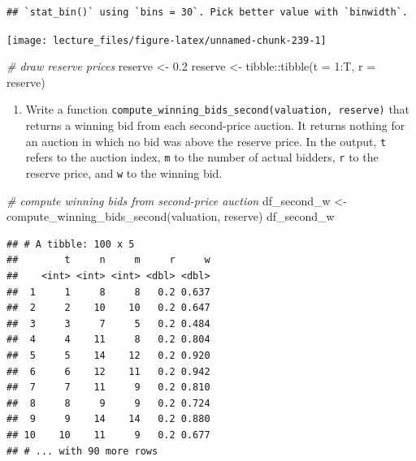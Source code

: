 \documentclass[
]{book}
\newenvironment{Shaded}{\begin{snugshade}}{\end{snugshade}}
\newcommand{\AttributeTok}[1]{\textcolor[rgb]{0.77,0.63,0.00}{#1}}
\newcommand{\CommentTok}[1]{\textcolor[rgb]{0.56,0.35,0.01}{\textit{#1}}}
\newcommand{\DecValTok}[1]{\textcolor[rgb]{0.00,0.00,0.81}{#1}}
\newcommand{\FloatTok}[1]{\textcolor[rgb]{0.00,0.00,0.81}{#1}}
\newcommand{\FunctionTok}[1]{\textcolor[rgb]{0.00,0.00,0.00}{#1}}
\newcommand{\NormalTok}[1]{#1}
\newcommand{\OtherTok}[1]{\textcolor[rgb]{0.56,0.35,0.01}{#1}}
\newcommand{\SpecialCharTok}[1]{\textcolor[rgb]{0.00,0.00,0.00}{#1}}
\providecommand{\tightlist}{%
  \setlength{\itemsep}{0pt}\setlength{\parskip}{0pt}}
\begin{document}
\begin{verbatim}
## `stat_bin()` using `bins = 30`. Pick better value with `binwidth`.
\end{verbatim}

\begin{center}\texttt{[image: lecture\_files/figure-latex/unnamed-chunk-239-1]} \end{center}

\begin{Shaded}
\begin{Highlighting}[]
\CommentTok{\# draw reserve prices}
\NormalTok{reserve }\OtherTok{\textless{}{-}} \FloatTok{0.2}
\NormalTok{reserve }\OtherTok{\textless{}{-}}\NormalTok{ tibble}\SpecialCharTok{::}\FunctionTok{tibble}\NormalTok{(}\AttributeTok{t =} \DecValTok{1}\SpecialCharTok{:}\NormalTok{T, }\AttributeTok{r =}\NormalTok{ reserve)}
\end{Highlighting}
\end{Shaded}

\begin{enumerate}
\def\labelenumi{\arabic{enumi}.}
\setcounter{enumi}{2}
\tightlist
\item
  Write a function \texttt{compute\_winning\_bids\_second(valuation,\ reserve)} that returns a winning bid from each second-price auction. It returns nothing for an auction in which no bid was above the reserve price. In the output, \texttt{t} refers to the auction index, \texttt{m} to the number of actual bidders, \texttt{r} to the reserve price, and \texttt{w} to the winning bid.
\end{enumerate}

\begin{Shaded}
\begin{Highlighting}[]
\CommentTok{\# compute winning bids from second{-}price auction}
\NormalTok{df\_second\_w }\OtherTok{\textless{}{-}}
  \FunctionTok{compute\_winning\_bids\_second}\NormalTok{(valuation, reserve)}
\NormalTok{df\_second\_w}
\end{Highlighting}
\end{Shaded}

\begin{verbatim}
## # A tibble: 100 x 5
##        t     n     m     r     w
##    <int> <int> <int> <dbl> <dbl>
##  1     1     8     8   0.2 0.637
##  2     2    10    10   0.2 0.647
##  3     3     7     5   0.2 0.484
##  4     4    11     8   0.2 0.804
##  5     5    14    12   0.2 0.920
##  6     6    12    11   0.2 0.942
##  7     7    11     9   0.2 0.810
##  8     8     9     9   0.2 0.724
##  9     9    14    14   0.2 0.880
## 10    10    11     9   0.2 0.677
## # ... with 90 more rows
\end{verbatim}
\end{document}
